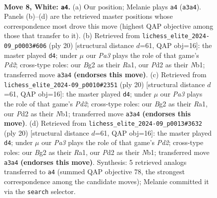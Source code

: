 \documentclass[11pt]{article}
\begin{document}
\begin{figure}[p]\centering
\begin{subfigure}{0.46\textwidth}\centering
\resizebox{\linewidth}{!}{%
\newchessgame
\chessboard[
  setfen={rnbq1rk1/1p2bppp/4pn2/p1pp4/2P5/PP3NP1/3PPPBP/RNBQ1RK1 w - - 0 8},
  showmover=false,
  pgfstyle=straightmove, color=movearrow, markmove={a3-a4}
]}
\caption{}
\end{subfigure}\hfill
\begin{subfigure}{0.46\textwidth}\centering
\resizebox{\linewidth}{!}{%
\newchessgame
\chessboard[
  setfen={r1bq1rk1/4bppp/p2p1n2/npp1p3/4P3/2P2N1P/PPBP1PP1/RNBQR1K1 w - - 0 11},
  showmover=false,
  pgfstyle=straightmove, color=movearrow, markmove={d2-d4}
]}
\caption{}
\end{subfigure}
\\[4pt]
\begin{subfigure}{0.46\textwidth}\centering
\resizebox{\linewidth}{!}{%
\newchessgame
\chessboard[
  setfen={r1bq1rk1/4bppp/p2p1n2/npp1p3/4P3/2P2N1P/PPBP1PP1/RNBQR1K1 w - - 0 11},
  showmover=false,
  pgfstyle=straightmove, color=movearrow, markmove={d2-d4}
]}
\caption{}
\end{subfigure}\hfill
\begin{subfigure}{0.46\textwidth}\centering
\resizebox{\linewidth}{!}{%
\newchessgame
\chessboard[
  setfen={r1bq1rk1/4bppp/p2p1n2/npp1p3/4P3/2P2N1P/PPBP1PP1/RNBQR1K1 w - - 0 11},
  showmover=false,
  pgfstyle=straightmove, color=movearrow, markmove={d2-d4}
]}
\caption{}
\end{subfigure}
\caption{\textbf{Move 8, White: \texttt{a4}.} (a) Our position; Melanie plays \texttt{a4} (\texttt{a3a4}). Panels (b)--(d) are the retrieved master positions whose correspondence most drove this move (highest QAP objective among those that transfer to it). (b) Retrieved from \texttt{lichess\_elite\_2024-09\_p0003\#606} (ply 20) [structural distance $d$=61, QAP obj=16]: the master played \texttt{d4}; under $\mu$ our \emph{Pa3} plays the role of that game's \emph{Pd2}; cross-type roles: our \emph{B}g2 as their \emph{R}a1, our \emph{P}d2 as their \emph{N}b1; transferred move \texttt{a3a4} \textbf{(endorses this move)}. (c) Retrieved from \texttt{lichess\_elite\_2024-09\_p0010\#2351} (ply 20) [structural distance $d$=61, QAP obj=16]: the master played \texttt{d4}; under $\mu$ our \emph{Pa3} plays the role of that game's \emph{Pd2}; cross-type roles: our \emph{B}g2 as their \emph{R}a1, our \emph{P}d2 as their \emph{N}b1; transferred move \texttt{a3a4} \textbf{(endorses this move)}. (d) Retrieved from \texttt{lichess\_elite\_2024-09\_p0013\#3632} (ply 20) [structural distance $d$=61, QAP obj=16]: the master played \texttt{d4}; under $\mu$ our \emph{Pa3} plays the role of that game's \emph{Pd2}; cross-type roles: our \emph{B}g2 as their \emph{R}a1, our \emph{P}d2 as their \emph{N}b1; transferred move \texttt{a3a4} \textbf{(endorses this move)}. Synthesis: 5 retrieved analogs transferred to \texttt{a4} (summed QAP objective 78, the strongest correspondence among the candidate moves); Melanie committed it via the \texttt{search} selector.}
\label{fig:thought-m14}
\end{figure}
\end{document}
